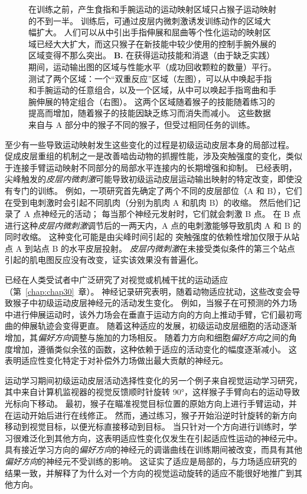 \begin{figure}[htbp]
{		在训练之前，产生食指和手腕运动的运动映射区域只占猴子运动映射的不到一半。
		训练后，可通过皮层内微刺激诱发训练动作的区域大幅扩大。
		人们可以从中引出手指伸展和屈曲等个性化运动的映射区域已经大大扩大，而这只猴子在新技能中较少使用的控制手腕外展的区域变得不那么突出。
		\textbf{B.} 在获得运动技能和消退（由于缺乏实践）期间，运动输出图的区域与性能水平（成功回收颗粒的数量）平行。
		测试了两个区域：一个“双重反应”区域（左图），可以从中唤起手指和手腕运动的任意组合，以及一个区域，从中可以唤起手指弯曲和手腕伸展的特定组合（右图）。
		这两个区域随着猴子的技能随着练习的提高而增加，随着猴子的技能因缺乏练习而消失而减小。
		这些数据来自与 A 部分中的猴子不同的猴子，但受过相同任务的训练。}
	\label{fig:34_24}
\end{figure}


至少有一些导致运动映射发生这些变化的过程是初级运动皮层本身的局部过程。
促成皮层重组的机制之一是改善啮齿动物的抓握性能，涉及突触强度的变化，类似于连接手臂运动映射不同部分的局部水平连接内的长期增强和抑制。
已经表明，尖峰触发的\textit{皮层内微刺激}可能导致初级运动皮层运动输出映射的特定改变，即使没有专门的训练。
例如，一项研究首先确定了两个不同的皮层部位（A 和 B），它们在受到电刺激时会引起不同肌肉（分别为肌肉 A 和肌肉 B）的收缩。
然后他们记录了 A 点神经元的活动； 每当那个神经元发射时，它们就会刺激 B 点。
在 B 点进行这种\textit{皮层内微刺激}调节后的一两天内，A 点的电刺激能够导致肌肉 A 和 B 的同时收缩。
这种变化可能是由尖峰时间引起的 突触强度的依赖性增加仅限于从站点 A 到站点 B 的水平皮层投射。
\textit{皮层内微刺激}在未接受类似条件的第三个站点引起的肌电图反应没有改变，证实该效果没有普遍化。


已经在人类受试者中广泛研究了对视觉或机械干扰的运动适应（第~\ref{chap:chap30}~章）。
神经记录研究表明，随着动物适应扰动，这些改变会导致猴子中初级运动皮层神经元的活动发生变化。
例如，当猴子在可预测的外力场中进行伸展运动时，该外力场会在垂直于运动方向的方向上推动手臂，它们最初弯曲的伸展轨迹会变得更直。
随着这种适应的发展，初级运动皮层细胞的活动逐渐增加，其\textit{偏好方向}调整与施加的力场相反。
随着力方向和细胞\textit{偏好方向}之间的角度增加，遵循类似余弦的函数，这种依赖于适应的活动变化的幅度逐渐减小。
这表明适应性变化特定于对补偿外力场做出最大贡献的神经元。


运动学习期间初级运动皮层活动选择性变化的另一个例子来自视觉运动学习研究，其中来自计算机监视器的视觉反馈顺时针旋转 90°，这样猴子手臂向右的运动导致光标向下移动。
最初，猴子在瞄准视觉目标位置的原始方向上进行手臂运动，并在运动开始后进行在线修正。
然而，通过练习，猴子开始沿逆时针旋转的新方向移动到视觉目标，以便光标直接移动到目标。
当只针对一个方向进行训练时，学习很难泛化到其他方向，这表明适应性变化仅发生在引起适应性运动的神经元中。
具有接近学习方向的\textit{偏好方向}的神经元的调谐曲线在训练期间被改变，而具有其他\textit{偏好方向}的神经元不受训练的影响。
这证实了适应是局部的，与力场适应研究的结果一致，并解释了为什么对一个方向的视觉运动旋转的适应不能很好地推广到其他方向。


